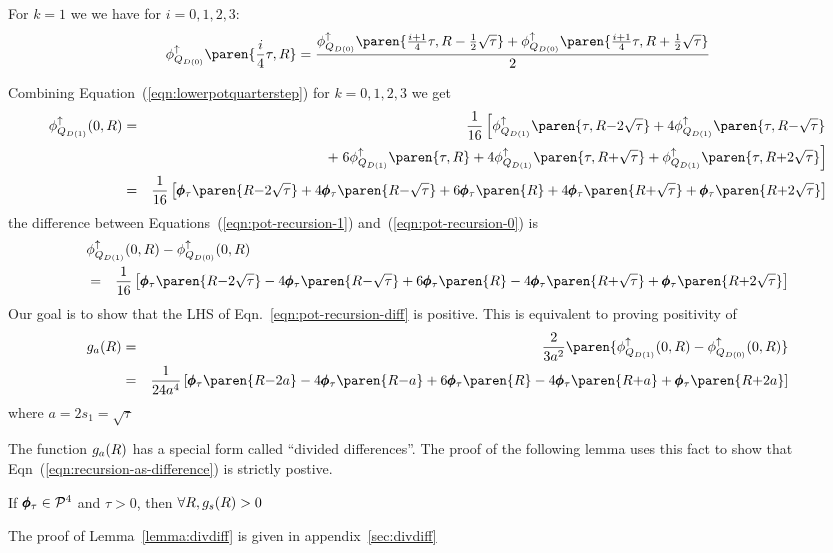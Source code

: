 \documentclass{article}[12pt]
\begin{document}
For $k=1$ we we have for $i=0,1,2,3$:
\begin{equation}   \label{eqn:lowerpotquarterstep}
   \lowerpotMdkpar{0}\paren{\frac{i}{4}\tau,\R}=
 \frac{\lowerpotMdkpar{0}\paren{\frac{i+1}{4}\tau,\R-\frac{1}{2}\sqrt{\tau}}+
   \lowerpotMdkpar{0}\paren{\frac{i+1}{4}\tau,\R+\frac{1}{2}\sqrt{\tau}}}{2}
 \end{equation}

\newcommand{\iter}[1]{\lowerpotMdkpar{1}\paren{\tau,\R {#1} \sqrt{\tau}}}
\newcommand{\iterzero}{\lowerpotMdkpar{1}\paren{\tau,\R}}

\newcommand{\fIter}[1]{\finalPotTau \paren{R {#1} \sqrt{\tau}}}
\newcommand{\fIterzero}{\finalPotTau \paren{R}}

\newcommand{\gIter}[1]{\finalPotTau \paren{R {#1} a}}
\newcommand{\gIterzero}{\finalPotTau \paren{R}}

Combining Equation~(\ref{eqn:lowerpotquarterstep}) for $k=0,1,2,3$ we get
\small
\begin{eqnarray} \label{eqn:pot-recursion-1}
  \lowerpotMdkpar{1}(0, \R)
  &=& \frac{1}{16}
      \left[\iter{-2}+4\iter{-} \right. \\
  &&+ \left. 6\iterzero +4\iter{+}+\iter{+2}\right] \nonumber\\
  &=& \frac{1}{16}
      \left[\fIter{-2}+4\fIter{-}+6\fIterzero +4\fIter{+}+\fIter{+2}\right] \nonumber
\end{eqnarray}
\normalsize the difference between
Equations~(\ref{eqn:pot-recursion-1}) and~(\ref{eqn:pot-recursion-0})
is \small
\begin{eqnarray} \label{eqn:pot-recursion-diff}
  \lefteqn{\lowerpotMdkpar{1}(0, \R) - \lowerpotMdkpar{0}(0, \R)}\\
&=&  \frac{1}{16}
\left[\fIter{-2}-4\fIter{-}+6\fIterzero -4\fIter{+}+\fIter{+2}\right] \nonumber
\end{eqnarray}
\normalsize Our goal is to show that the LHS of
Eqn.~\ref{eqn:pot-recursion-diff} is positive. This is equivalent to
proving positivity of
\begin{eqnarray}
g_a(\R) &=& \frac{2}{3a^2}\paren{\lowerpotMdkpar{1}(0, \R) -
  \lowerpotMdkpar{0}(0, \R)}\nonumber \\
& = &
\frac{1}{24 a^4}
      \left[\gIter{-2}-4\gIter{-}+6\gIterzero -4\gIter{+}+\gIter{+2}\right]
       \label{eqn:recursion-as-difference}
\end{eqnarray}
where $a=2 s_1=\sqrt{\tau}$

The function $g_a(R)$ has a special form called ``divided
differences''. The proof of the following lemma uses this fact to show that 
Eqn~(\ref{eqn:recursion-as-difference}) is strictly postive.
\begin{lemma} \label{lemma:divdiff}
If $\pmb{\phi}_{\tau} \in {\cal P}^{4}$ and $\tau>0$, then $\forall R, g_s(R)>0$
\end{lemma}
The proof of Lemma~\ref{lemma:divdiff} is given in appendix~\ref{sec:divdiff}
\end{document}
